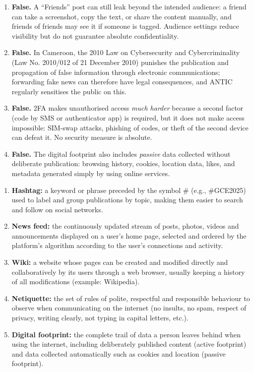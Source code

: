 \documentclass[11pt]{article}
\begin{document}
\begin{corrige}
\begin{enumerate}
    \item \textbf{False.} A ``Friends'' post can still leak beyond the intended audience: a friend can take a screenshot, copy the text, or share the content manually, and friends of friends may see it if someone is tagged. Audience settings reduce visibility but do not guarantee absolute confidentiality.
    \item \textbf{False.} In Cameroon, the 2010 Law on Cybersecurity and Cybercriminality (Law No. 2010/012 of 21 December 2010) punishes the publication and propagation of false information through electronic communications; forwarding fake news can therefore have legal consequences, and ANTIC regularly sensitises the public on this.
    \item \textbf{False.} 2FA makes unauthorised access \emph{much harder} because a second factor (code by SMS or authenticator app) is required, but it does not make access impossible: SIM-swap attacks, phishing of codes, or theft of the second device can defeat it. No security measure is absolute.
    \item \textbf{False.} The digital footprint also includes \emph{passive} data collected without deliberate publication: browsing history, cookies, location data, likes, and metadata generated simply by using online services.
\end{enumerate}
\end{corrige}

\begin{corrige}
\begin{enumerate}
    \item \textbf{Hashtag:} a keyword or phrase preceded by the symbol \# (e.g., \#GCE2025) used to label and group publications by topic, making them easier to search and follow on social networks.
    \item \textbf{News feed:} the continuously updated stream of posts, photos, videos and announcements displayed on a user's home page, selected and ordered by the platform's algorithm according to the user's connections and activity.
    \item \textbf{Wiki:} a website whose pages can be created and modified directly and collaboratively by its users through a web browser, usually keeping a history of all modifications (example: Wikipedia).
    \item \textbf{Netiquette:} the set of rules of polite, respectful and responsible behaviour to observe when communicating on the internet (no insults, no spam, respect of privacy, writing clearly, not typing in capital letters, etc.).
    \item \textbf{Digital footprint:} the complete trail of data a person leaves behind when using the internet, including deliberately published content (active footprint) and data collected automatically such as cookies and location (passive footprint).
\end{enumerate}
\end{corrige}
\end{document}
